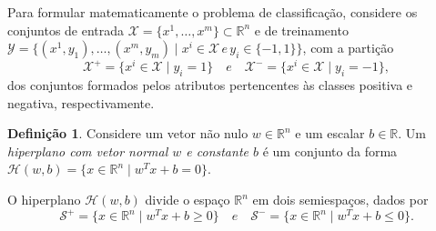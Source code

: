 \documentclass[12pt,a4paper]{scrartcl}
\def\Xset{\mathcal{X}}
\def\Yset{\mathcal{Y}}
\def\Hset{\mathcal{H}}
\def\RR{\mathds{R}}
\theoremstyle{definition}%
\newtheorem{defi}{Definição}
\begin{document}
Para formular matematicamente o problema de classificação, considere os conjuntos de entrada $\Xset =\{x^1, \ldots , x^m \} \subset \RR^n$ e de treinamento $\Yset=\{(x^1, y_1), \ldots , (x^m, y_m)\mid x^i \in \Xset \, e \, y_i \in \{-1,1\}\}$, com a partição 
\[ \label{conj1}
\Xset ^{+} =\{x^i \in \Xset\mid y_i=1\} \quad e \quad \Xset^{-}=\{x^i \in \Xset\mid y_i=-1\},
\]
dos conjuntos formados pelos atributos pertencentes às classes positiva e negativa, respectivamente.

\begin{defi} Considere um vetor não nulo $w\in \RR^n$ e um escalar $b\in \RR$. Um \emph{hiperplano com vetor normal $w$ e constante $b$} é um conjunto da forma $\Hset(w,b)=\{x\in \RR^n \mid w^{T}x+b=0\}$.
\end{defi}

O hiperplano $\Hset(w,b)$ divide o espaço $\RR^n$ em dois semiespaços, dados por
\[ \label{conj2}
\mathcal{S}^{+}=\{x\in \RR^n \mid w^{T}x+b\geq 0\} \quad e \quad \mathcal{S}^{-}=\{x\in \RR^n \mid w^{T}x+b\leq 0\}.
\]
\end{document}
